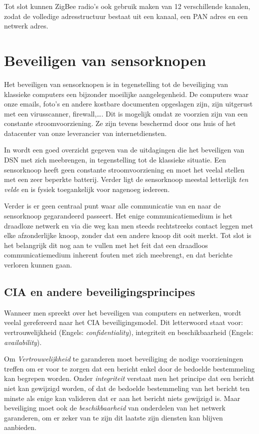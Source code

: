 Tot slot kunnen ZigBee radio's ook gebruik maken van 12 verschillende kanalen,
zodat de volledige adresstructuur bestaat uit een kanaal, een PAN adres en een
netwerk adres.

\section{Beveiligen van sensorknopen}
\label{section:beveiligen}

Het beveiligen van sensorknopen is in tegenstelling tot de beveiliging van
klassieke computers een bijzonder moeilijke aangelegenheid. De computers waar
onze emails, foto's en andere kostbare documenten opgeslagen zijn, zijn
uitgerust met een virusscanner, firewall,\dots. Dit is mogelijk omdat ze
voorzien zijn van een constante stroomvoorziening. Ze zijn tevens beschermd
door ons huis of het datacenter van onze leverancier van internetdiensten.

In \cite{dargie2010fundamentals} wordt een goed overzicht gegeven van de
uitdagingen die het beveiligen van DSN met zich meebrengen, in tegenstelling
tot de klassieke situatie. Een sensorknoop heeft geen constante
stroomvoorziening en moet het veelal stellen met een zeer beperkte batterij.
Verder ligt de sensorknoop meestal letterlijk \emph{ten velde} en is fysiek
toegankelijk voor nagenoeg iedereen.

Verder is er geen centraal punt waar alle communicatie van en naar de
sensorknoop gegarandeerd passeert. Het enige communicatiemedium is het
draadloze netwerk en via die weg kan men steeds rechtstreeks contact leggen met
elke afzonderlijke knoop, zonder dat een andere knoop dit ooit merkt. Tot slot
is het belangrijk dit nog aan te vullen met het feit dat een draadloos
communicatiemedium inherent fouten met zich meebrengt, en dat berichte verloren
kunnen gaan.

\subsection{CIA en andere beveiligingsprincipes}
\label{subsection:cia}

Wanneer men spreekt over het beveiligen van computers en netwerken, wordt
veelal gerefereerd naar het CIA beveiligingsmodel. Dit letterwoord staat voor:
vertrouwelijkheid (Engels: \emph{confidentiality}), integriteit en
beschikbaarheid (Engels: \emph{availability}).

Om \emph{Vertrouwelijkheid} te garanderen moet beveiliging de nodige
voorzieningen treffen om er voor te zorgen dat een bericht enkel door de
bedoelde bestemmeling kan begrepen worden. Onder \emph{integriteit} verstaat
men het principe dat een bericht niet kan gewijzigd worden, of dat de bedoelde
bestemmeling van het bericht ten minste als enige kan valideren dat er aan het
bericht niets gewijzigd is. Maar beveiliging moet ook de \emph{beschikbaarheid}
van onderdelen van het netwerk garanderen, om er zeker van te zijn dit laatste
zijn diensten kan blijven aanbieden.

